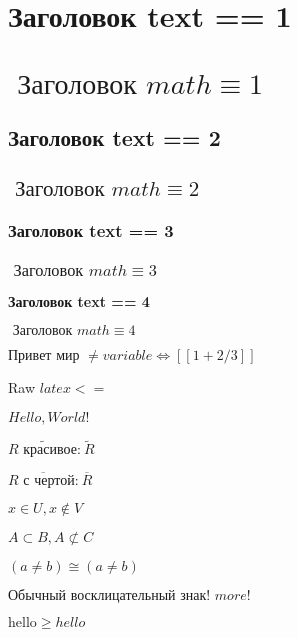 \documentclass[12pt,a4paper]{scrartcl}
\def\t{\text}
\begin{document}
\section*{ Заголовок text == 1}

\section*{\(\text{ Заголовок }\allowbreak math \equiv  1\)}

\subsection*{ Заголовок text == 2}

\subsection*{\(\text{ Заголовок }\allowbreak math \equiv  2\)}

\subsubsection*{ Заголовок text == 3}

\subsubsection*{\(\text{ Заголовок }\allowbreak math \equiv  3\)}

\medskip\textbf{ Заголовок text == 4}\medskip

\medskip\textbf{\(\text{ Заголовок }\allowbreak math \equiv  4\)}\medskip


\(\text{Привет }\allowbreak \text{мир }\allowbreak \neq  variable \Leftrightarrow  [[1 + 2 / 3]]\)

Raw $latex <=$


\(Hello, World!\)

\(\widetilde {R\text{ красивое:}\allowbreak }\ \widetilde R\)

\(\overline {R\text{ с }\allowbreak \text{чертой:}\allowbreak }\ \overline R\)

\(x \in U, x \not\in V\)

\(A \subset B, A \not\subset C\)

\((a \neq  b) \cong  (a \neq  b)\)

\(\text{Обычный }\allowbreak \text{восклицательный }\allowbreak \text{знак! }\allowbreak more!\)

\(\t{hello} \ge  hello\)
\end{document}
